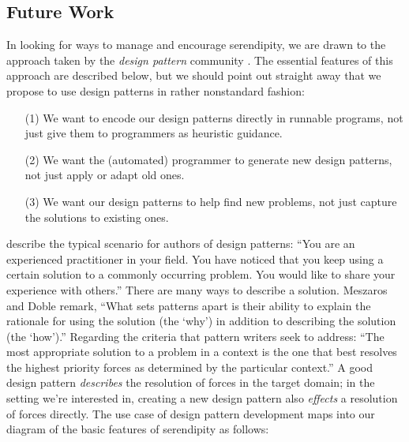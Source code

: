 \subsection{Future Work} \label{sec:futurework} \label{sec:hatching}

In looking for ways to manage and encourage serendipity, we are drawn to the approach taken by the \emph{design
  pattern} community \cite{alexander1999origins}.  The essential
features of this approach are described below, but we should point out
straight away that we propose to use design patterns in rather
nonstandard fashion:
\begin{itemize}
\item[(1)] We want to encode our design patterns directly in runnable
  programs, not just give them to programmers as heuristic guidance.
\item[(2)] We want the (automated) programmer to generate new design
  patterns, not just apply or adapt old ones.
\item[(3)] We want our design patterns to help find new problems,
  not just capture the solutions to existing ones.
\end{itemize}

 describe the typical scenario for authors of design
patterns: ``You are an experienced practitioner in your
field. You have noticed that you keep using a certain solution to a
commonly occurring problem. You would like to share your experience
with others.''  There are many ways to describe a solution.
Meszaros and Doble remark, ``What sets patterns apart is their
ability to explain the rationale for using the solution (the `why') in
addition to describing the solution (the `how').''  Regarding the
criteria that pattern writers seek to address: ``The most appropriate
solution to a problem in a context is the one that best resolves the
highest priority forces as determined by the particular context.'' 
%
%
A good design pattern \emph{describes} the resolution of forces in the
target domain; in the setting we're interested in, creating a new
design pattern also \emph{effects} a resolution of forces directly.
The use case of design pattern development maps into our diagram of
the basic features of serendipity as follows:



